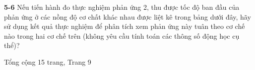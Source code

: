 \vspace{0.2cm}

\noindent
\textbf{5-6} Nếu tiến hành đo thực nghiệm phản ứng 2, thu được tốc độ ban đầu của phản ứng ở các nồng độ cơ chất khác nhau được liệt kê trong bảng dưới đây, hãy sử dụng kết quả thực nghiệm để phân tích xem phản ứng này tuân theo cơ chế nào trong hai cơ chế trên (không yêu cầu tính toán các thông số động học cụ thể)?


\noindent{}

\vfill
\begin{center}
    \small Tổng cộng 15 trang, Trang 9
\end{center}

\newpage


